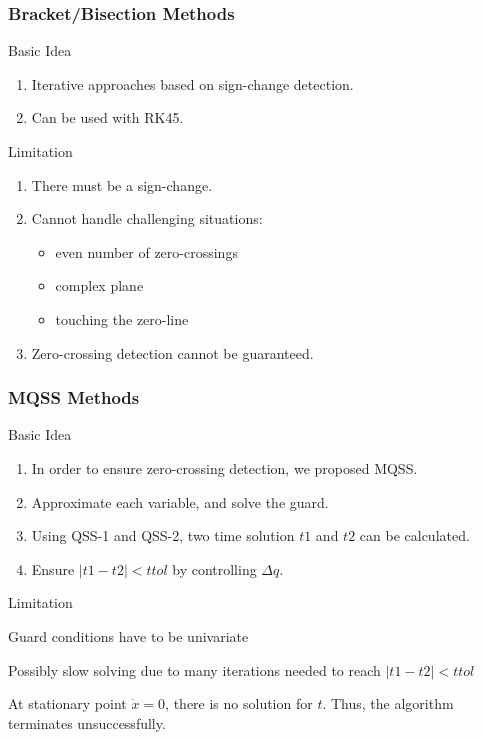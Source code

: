 \begin{frame} \frametitle{Bracket/Bisection Methods}
	\vspace{-5pt}
	\begin{block}{Basic Idea}
		\begin{enumerate}
			\item Iterative approaches based on sign-change detection.
			\item Can be used with RK45.
		\end{enumerate}
	\end{block}
	
	\begin{block}{Limitation}
		\begin{enumerate}
			\item There must be a sign-change.
			\item Cannot handle challenging situations: 
			\begin{itemize}
				\item even number of zero-crossings
				\item complex plane
				\item touching the zero-line
			\end{itemize}
			\item Zero-crossing detection cannot be guaranteed.
		\end{enumerate}
	\end{block}
	\centering
\end{frame}

\begin{frame} \frametitle{ MQSS Methods }
	\vspace{-5pt}
	\begin{block}{Basic Idea}
		\begin{enumerate}
			\item In order to ensure zero-crossing detection, we proposed MQSS.
			\item Approximate each variable, and solve the guard.
			\item Using QSS-1 and QSS-2, two time solution $t1$ and $t2$ can be calculated.
			\item Ensure $|t1 - t2| < ttol$ by controlling $\Delta q$.
		\end{enumerate}
	\end{block}
	
	\begin{block}{Limitation}
		\begin{myitemize}
			\item Guard conditions have to be univariate
			\item Possibly slow solving due to many iterations needed to reach $|t1 - t2| < ttol$
			\item At stationary point $\dot{x} = 0$, there is no solution for $t$. Thus, the algorithm terminates unsuccessfully.
		\end{myitemize}
	\end{block}
	\centering
\end{frame}

